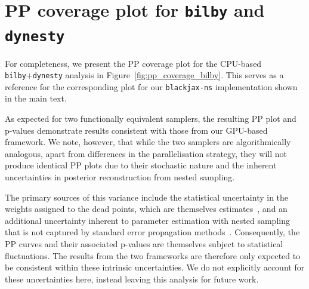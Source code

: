 \documentclass[fleqn,usenatbib]{mnras}
\begin{document}







\appendix


\section{PP coverage plot for \texttt{bilby} and \texttt{dynesty}}
\label{app:bilby_pp_plot}

For completeness, we present the PP coverage plot for the CPU-based
\texttt{bilby}+\texttt{dynesty} analysis in
Figure~\ref{fig:pp_coverage_bilby}. This serves as a reference for the
corresponding plot for our \texttt{blackjax-ns} implementation shown in
the main text.

As expected for two functionally equivalent samplers, the resulting PP
plot and p-values demonstrate results consistent with
those from our GPU-based framework. We note, however, that while
the two samplers are algorithmically analogous, apart from differences
in the parallelisation strategy, they will not produce
identical PP plots due to their stochastic nature and the inherent
uncertainties in posterior reconstruction from nested sampling.

The primary sources of this variance include the statistical
uncertainty in the weights assigned to the dead points, which are
themselves estimates~\citep{skilling, Higson_Errors}, and an additional
uncertainty inherent to parameter estimation with nested sampling that
is not captured by standard error propagation
methods~\citep{Prathaban_PE_errors}. Consequently, the PP curves and
their associated p-values are themselves subject to statistical
fluctuations. The results from the two frameworks are therefore only
expected to be consistent within these intrinsic uncertainties.
We do not explicitly account for these uncertainties
here, instead leaving this analysis for future work.
\end{document}
